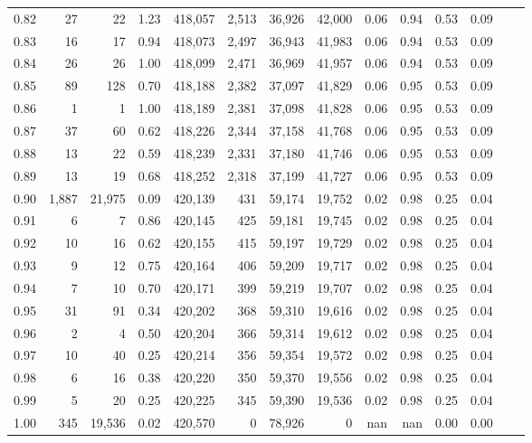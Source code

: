 \begin{tabular}{rrrrrrrrrrrrrr}
0.82 &      27 &      22 &      1.23 &  418,057 &    2,513 &  36,926 &  42,000 &  0.06 &  0.94 &  0.53 &      0.09 \\
0.83 &      16 &      17 &      0.94 &  418,073 &    2,497 &  36,943 &  41,983 &  0.06 &  0.94 &  0.53 &      0.09 \\
0.84 &      26 &      26 &      1.00 &  418,099 &    2,471 &  36,969 &  41,957 &  0.06 &  0.94 &  0.53 &      0.09 \\
0.85 &      89 &     128 &      0.70 &  418,188 &    2,382 &  37,097 &  41,829 &  0.06 &  0.95 &  0.53 &      0.09 \\
0.86 &       1 &       1 &      1.00 &  418,189 &    2,381 &  37,098 &  41,828 &  0.06 &  0.95 &  0.53 &      0.09 \\
0.87 &      37 &      60 &      0.62 &  418,226 &    2,344 &  37,158 &  41,768 &  0.06 &  0.95 &  0.53 &      0.09 \\
0.88 &      13 &      22 &      0.59 &  418,239 &    2,331 &  37,180 &  41,746 &  0.06 &  0.95 &  0.53 &      0.09 \\
0.89 &      13 &      19 &      0.68 &  418,252 &    2,318 &  37,199 &  41,727 &  0.06 &  0.95 &  0.53 &      0.09 \\
0.90 &   1,887 &  21,975 &      0.09 &  420,139 &      431 &  59,174 &  19,752 &  0.02 &  0.98 &  0.25 &      0.04 \\
0.91 &       6 &       7 &      0.86 &  420,145 &      425 &  59,181 &  19,745 &  0.02 &  0.98 &  0.25 &      0.04 \\
0.92 &      10 &      16 &      0.62 &  420,155 &      415 &  59,197 &  19,729 &  0.02 &  0.98 &  0.25 &      0.04 \\
0.93 &       9 &      12 &      0.75 &  420,164 &      406 &  59,209 &  19,717 &  0.02 &  0.98 &  0.25 &      0.04 \\
0.94 &       7 &      10 &      0.70 &  420,171 &      399 &  59,219 &  19,707 &  0.02 &  0.98 &  0.25 &      0.04 \\
0.95 &      31 &      91 &      0.34 &  420,202 &      368 &  59,310 &  19,616 &  0.02 &  0.98 &  0.25 &      0.04 \\
0.96 &       2 &       4 &      0.50 &  420,204 &      366 &  59,314 &  19,612 &  0.02 &  0.98 &  0.25 &      0.04 \\
0.97 &      10 &      40 &      0.25 &  420,214 &      356 &  59,354 &  19,572 &  0.02 &  0.98 &  0.25 &      0.04 \\
0.98 &       6 &      16 &      0.38 &  420,220 &      350 &  59,370 &  19,556 &  0.02 &  0.98 &  0.25 &      0.04 \\
0.99 &       5 &      20 &      0.25 &  420,225 &      345 &  59,390 &  19,536 &  0.02 &  0.98 &  0.25 &      0.04 \\
1.00 &     345 &  19,536 &      0.02 &  420,570 &        0 &  78,926 &       0 &   nan &   nan &  0.00 &      0.00 \\
\bottomrule
\end{tabular}

